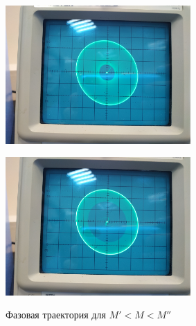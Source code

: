 \begin{center}
    \begin{figure}[H]
        \begin{minipage}{0.49\linewidth}
            \centering
            \includegraphics[height=150pt]{img/20.jpg} 
            \vspace{0pt}
            \label{fig:11}
        \end{minipage}
        \begin{minipage}{0.49\linewidth}
            \centering
            \includegraphics[height=150pt]{img/21.jpg} 
            \vspace{0pt}
            \label{fig:12}
        \end{minipage}
    \caption{Фазовая траектория для $M'< M < M''$}
    \vspace{-40pt}
    \end{figure}
\end{center} 

